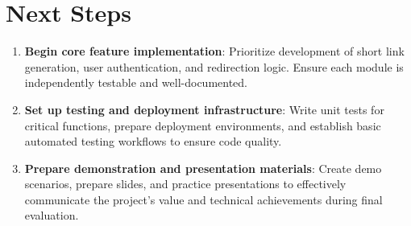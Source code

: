 \documentclass[11pt,a4paper]{article}
\begin{document}
\section{Next Steps}

\begin{adjustwidth}{1.5em}{}
\begin{enumerate}[leftmargin=*]
    \item \textbf{Begin core feature implementation}: Prioritize development of short link generation, user authentication, and redirection logic. Ensure each module is independently testable and well-documented.

    \item \textbf{Set up testing and deployment infrastructure}: Write unit tests for critical functions, prepare deployment environments, and establish basic automated testing workflows to ensure code quality.

    \item \textbf{Prepare demonstration and presentation materials}: Create demo scenarios, prepare slides, and practice presentations to effectively communicate the project's value and technical achievements during final evaluation.
\end{enumerate}
\end{adjustwidth}
\end{document}
